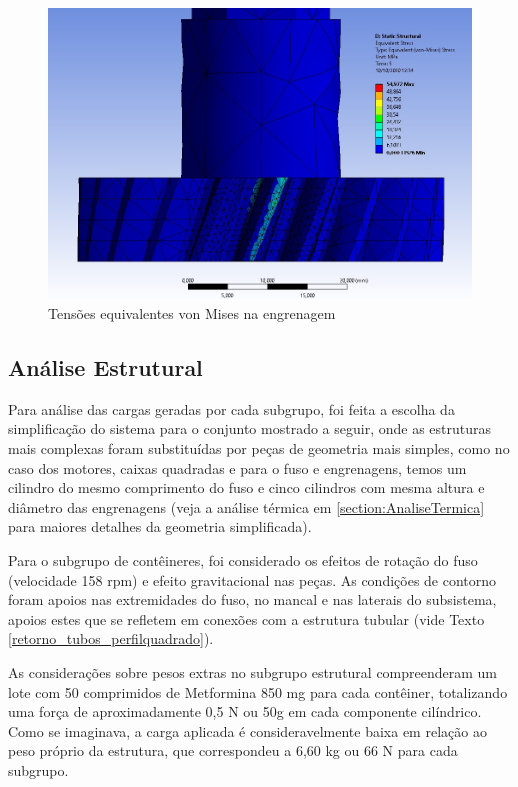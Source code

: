 \begin{figure}[ht]
        \centering
        \includegraphics[width=.8\textwidth]{figuras/estrutura/InteracaoFusoEng/tensao engrenagem.jpeg}
        \caption{Tensões equivalentes von Mises na engrenagem}
        \label{fig:tensaoeng}
    \end{figure}    


\subsection{Análise Estrutural}
    
Para análise das cargas geradas por cada subgrupo, foi feita a escolha da simplificação do sistema para o conjunto mostrado a seguir, onde as estruturas mais complexas foram substituídas por peças de geometria mais simples, como no caso dos motores, caixas quadradas e para o fuso e engrenagens, temos um cilindro do mesmo comprimento do fuso e cinco cilindros com mesma altura e diâmetro das engrenagens (veja a análise térmica em \ref{section:AnaliseTermica} para maiores detalhes da geometria simplificada).


Para o subgrupo de contêineres, foi considerado os efeitos de rotação do fuso (velocidade 158 rpm) e efeito gravitacional nas peças. As condições de contorno foram apoios nas extremidades do fuso, no mancal e nas laterais do subsistema, apoios estes que se refletem em conexões com a estrutura tubular (vide Texto \ref{retorno_tubos_perfilquadrado}). 

As considerações sobre pesos extras no subgrupo estrutural compreenderam um lote com 50 comprimidos de Metformina 850 mg para cada contêiner, totalizando uma força de aproximadamente 0,5 N ou 50g em cada componente cilíndrico. Como se imaginava, a carga aplicada é consideravelmente baixa em relação ao peso próprio da estrutura, que correspondeu a 6,60 kg ou 66 N para cada subgrupo. 

